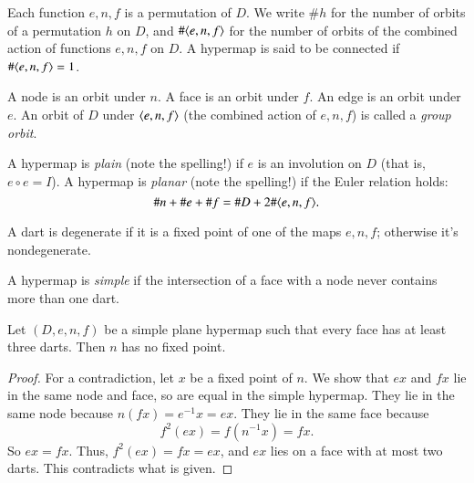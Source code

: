 Each function $e,n,f$ is a permutation of $D$.  
We write $\#h$ for the
number of orbits of a permutation $h$ on $D$, and $\#\langle e,n,f\rangle$
for the number of orbits of the combined action of functions $e,n,f$
on $D$.  A hypermap is said to be connected if 
  $\#\langle e,n,f\rangle = 1$.  

\begin{definition}  A node is an orbit  under
$n$.  A face is an  orbit  under $f$.  An edge
is an orbit under $e$. An orbit of $D$ under $\langle e,n,f\rangle$
(the combined action of $e,n,f$) is called a {\it group orbit}.
\end{definition}

\begin{definition} A hypermap is {\it plain} (note the spelling!) if
$e$ is an involution on $D$ (that is, $e\circ e = I$).  A hypermap
is {\it planar} (note the spelling!) if the Euler relation holds:
    $$\# n + \# e + \# f = \# D + 2 \#\langle e,n,f\rangle.$$
\end{definition}

\begin{definition} A dart is degenerate if it is a
fixed point of one of the maps $e,n,f$; otherwise it's nondegenerate.  
\end{definition}

\begin{definition} 
A hypermap is {\it simple} if the intersection of a face with
a node never contains more than one dart.
\end{definition}


\begin{lemma}\label{lemma:nondegen} 
Let $(D,e,n,f)$ be a simple plane hypermap such that every face has
at least three darts.
Then $n$ has no fixed point.
\end{lemma}

\begin{proof}  For a contradiction, let $x$ be a fixed point of
$n$. We show that $e x$ and $f x$ lie in the same node and
face, so are equal in the simple hypermap.  
They lie in the same node because
$n(f x) = e^{-1} x = e x$. They lie in the same face because
    $$f^2 (e x) =  f(n^{-1} x) = f x.$$
So $e x = f x$.   Thus, $f^2 (e x) = f x = e x$, and $e x$ lies on a
face with at most two darts.  This contradicts what is given.
\end{proof}

